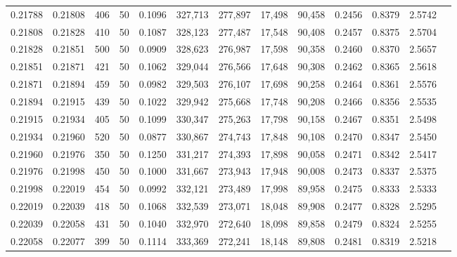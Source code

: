 \begin{tabular}{rrrrrrrrrrrrr}
0.21788 & 0.21808 &   406 &  50 &                                     0.1096 & 327,713 & 277,897 &  17,498 &  90,458 & 0.2456 & 0.8379 & 2.5742 \\
0.21808 & 0.21828 &   410 &  50 &                                     0.1087 & 328,123 & 277,487 &  17,548 &  90,408 & 0.2457 & 0.8375 & 2.5704 \\
0.21828 & 0.21851 &   500 &  50 &                                     0.0909 & 328,623 & 276,987 &  17,598 &  90,358 & 0.2460 & 0.8370 & 2.5657 \\
0.21851 & 0.21871 &   421 &  50 &                                     0.1062 & 329,044 & 276,566 &  17,648 &  90,308 & 0.2462 & 0.8365 & 2.5618 \\
0.21871 & 0.21894 &   459 &  50 &                                     0.0982 & 329,503 & 276,107 &  17,698 &  90,258 & 0.2464 & 0.8361 & 2.5576 \\
0.21894 & 0.21915 &   439 &  50 &                                     0.1022 & 329,942 & 275,668 &  17,748 &  90,208 & 0.2466 & 0.8356 & 2.5535 \\
0.21915 & 0.21934 &   405 &  50 &                                     0.1099 & 330,347 & 275,263 &  17,798 &  90,158 & 0.2467 & 0.8351 & 2.5498 \\
0.21934 & 0.21960 &   520 &  50 &                                     0.0877 & 330,867 & 274,743 &  17,848 &  90,108 & 0.2470 & 0.8347 & 2.5450 \\
0.21960 & 0.21976 &   350 &  50 &                                     0.1250 & 331,217 & 274,393 &  17,898 &  90,058 & 0.2471 & 0.8342 & 2.5417 \\
0.21976 & 0.21998 &   450 &  50 &                                     0.1000 & 331,667 & 273,943 &  17,948 &  90,008 & 0.2473 & 0.8337 & 2.5375 \\
0.21998 & 0.22019 &   454 &  50 &                                     0.0992 & 332,121 & 273,489 &  17,998 &  89,958 & 0.2475 & 0.8333 & 2.5333 \\
0.22019 & 0.22039 &   418 &  50 &                                     0.1068 & 332,539 & 273,071 &  18,048 &  89,908 & 0.2477 & 0.8328 & 2.5295 \\
0.22039 & 0.22058 &   431 &  50 &                                     0.1040 & 332,970 & 272,640 &  18,098 &  89,858 & 0.2479 & 0.8324 & 2.5255 \\
0.22058 & 0.22077 &   399 &  50 &                                     0.1114 & 333,369 & 272,241 &  18,148 &  89,808 & 0.2481 & 0.8319 & 2.5218 \\

\end{tabular}
